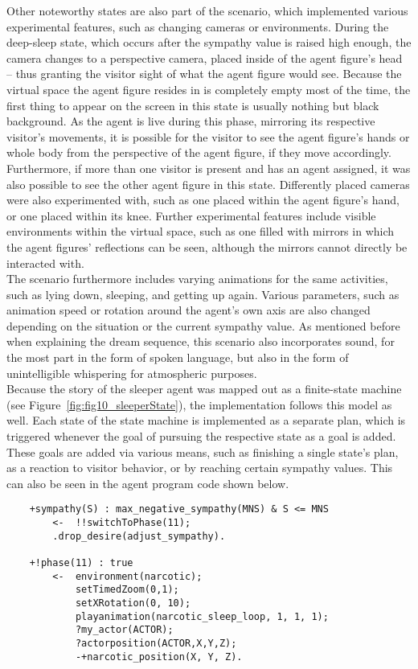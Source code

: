 \documentclass[draft,final]{vutinfth} %
\begin{document}
Other noteworthy states are also part of the scenario, which implemented various experimental features, such as changing cameras or environments. 
During the deep-sleep state, which occurs after the sympathy value is raised high enough, the camera changes to a perspective camera, placed inside of the \gls{agent figure}’s head – thus granting the \gls{visitor} sight of what the \gls{agent figure} would see. 
Because the virtual space the \gls{agent figure} resides in is completely empty most of the time, the first thing to appear on the screen in this state is usually nothing but black background. 
As the agent is \gls{live} during this phase, mirroring its respective \gls{visitor}’s movements, it is possible for the \gls{visitor} to see the \gls{agent figure}'s hands or whole body from the perspective of the \gls{agent figure}, if they move accordingly. 
Furthermore, if more than one \gls{visitor} is present and has an agent assigned, it was also possible to see the other \gls{agent figure} in this state. 
Differently placed cameras were also experimented with, such as one placed within the \gls{agent figure}’s hand, or one placed within its knee. 
Further experimental features include visible environments within the virtual space, such as one filled with mirrors in which the \glspl{agent figure}’ reflections can be seen, although the mirrors cannot directly be interacted with. \\
The scenario furthermore includes varying animations for the same activities, such as lying down, sleeping, and getting up again.
Various parameters, such as animation speed or rotation around the agent’s own axis are also changed depending on the situation or the current sympathy value. 
As mentioned before when explaining the dream sequence, this scenario also incorporates sound, for the most part in the form of spoken language, but also in the form of unintelligible whispering for atmospheric purposes. \\
Because the story of the sleeper agent was mapped out as a finite-state machine (see Figure~\ref{fig:fig10_sleeperState}), the implementation follows this model as well. 
Each state of the state machine is implemented as a separate plan, which is triggered whenever the goal of pursuing the respective state as a goal is added. 
These goals are added via various means, such as finishing a single state’s plan, as a reaction to \gls{visitor} behavior, or by reaching certain sympathy values. 
This can also be seen in the agent program code shown below. 
\begin{verbatim}
    +sympathy(S) : max_negative_sympathy(MNS) & S <= MNS
        <-  !!switchToPhase(11);    
        .drop_desire(adjust_sympathy).

    +!phase(11) : true
        <-  environment(narcotic);
            setTimedZoom(0,1);
            setXRotation(0, 10);
            playanimation(narcotic_sleep_loop, 1, 1, 1);
            ?my_actor(ACTOR);
            ?actorposition(ACTOR,X,Y,Z);
            -+narcotic_position(X, Y, Z).
\end{verbatim}
\end{document}
